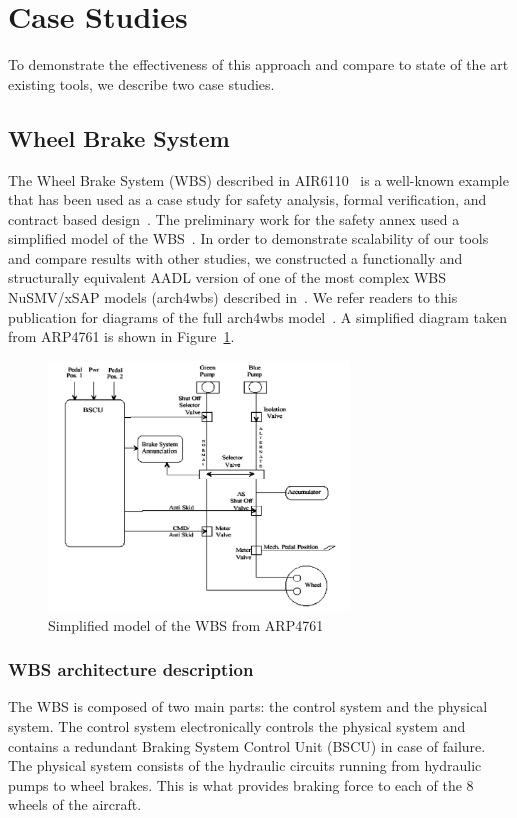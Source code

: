 \section{Case Studies}

To demonstrate the effectiveness of this approach and compare to state of the art existing tools, we describe two case studies.

\subsection{Wheel Brake System}
The Wheel Brake System (WBS) described in AIR6110~\cite{AIR6110} is a well-known example that has been used as a case study for safety analysis, formal verification, and contract based design~\cite{DBLP:conf/cav/BozzanoCPJKPRT15, 10.1007/978-3-319-11936-6-7, CAV2015:BoCiGrMa, Joshi05:SafeComp}. The preliminary work for the safety annex used a simplified model of the WBS~\cite{Stewart17:IMBSA}. In order to demonstrate scalability of our tools and compare results with other studies, we constructed a functionally and structurally equivalent AADL version of one of the most complex WBS NuSMV/xSAP models (arch4wbs) described in~\cite{DBLP:conf/cav/BozzanoCPJKPRT15,mattareiThesis}. We refer readers to this publication for diagrams of the full arch4wbs model~\cite{DBLP:conf/cav/BozzanoCPJKPRT15}. A simplified diagram taken from ARP4761 is shown in Figure~\ref{fig:wbs_arp4761}. 

\begin{figure}[h]
\begin{center}
\includegraphics[width=8cm]{images/wbs_arp4761}
\caption{Simplified model of the WBS from ARP4761} \label{fig:wbs_arp4761}
\end{center}
\end{figure}

\subsubsection{WBS architecture description}
The WBS is composed of two main parts: the control system and the physical system. The control system electronically controls the physical system and contains a redundant Braking System Control Unit (BSCU) in case of failure. The physical system consists of the hydraulic circuits running from hydraulic pumps to wheel brakes. This is what provides braking force to each of the 8 wheels of the aircraft.

